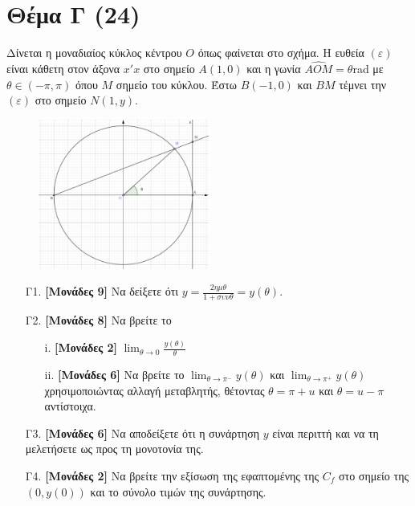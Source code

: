 \documentclass[14pt]{extarticle}
\begin{document}
\section*{Θέμα Γ (24)}
Δίνεται η μοναδιαίος κύκλος κέντρου $Ο$ όπως φαίνεται στο σχήμα. Η ευθεία $(ε)$ είναι κάθετη στον άξονα $x'x$ στο σημείο $Α(1,0)$ και η γωνία $\widehat{ΑΟΜ}=θ$rad με $θ\in(-π,π)$ όπου $Μ$ σημείο του κύκλου. Έστω $Β(-1,0)$ και $ΒΜ$ τέμνει την $(ε)$ στο σημείο $Ν(1,y)$.
\begin{figure}[h]
 \includegraphics[width=0.5\textwidth]{2021Prosomeivsi.png}
 \centering
\end{figure}
\begin{enumerate}
 \item[Γ1.] \textbf{[Μονάδες 9]} Να δείξετε ότι $y=\frac{2ημθ}{1+συνθ}=y(θ)$.
 \item[Γ2.] \textbf{[Μονάδες 8]} Να βρείτε το
       \begin{enumerate}
        \item[i.] \textbf{[Μονάδες 2]} $\lim_{θ\to 0}\frac{y(θ)}{θ}$
        \item[ii.] \textbf{[Μονάδες 6]} Να βρείτε το $\lim_{θ\to π^-}y(θ)$ και $\lim_{θ\to π^+}y(θ)$ χρησιμοποιώντας αλλαγή μεταβλητής, θέτοντας $θ=π+u$ και $θ=u-π$ αντίστοιχα.
       \end{enumerate}
 \item[Γ3.] \textbf{[Μονάδες 6]} Να αποδείξετε ότι η συνάρτηση $y$ είναι περιττή και να τη μελετήσετε ως προς τη μονοτονία της.
 \item[Γ4.] \textbf{[Μονάδες 2]} Να βρείτε την εξίσωση της εφαπτομένης της $C_f$ στο σημείο της $(0,y(0))$ και το σύνολο τιμών της συνάρτησης.
\end{enumerate}
\end{document}

